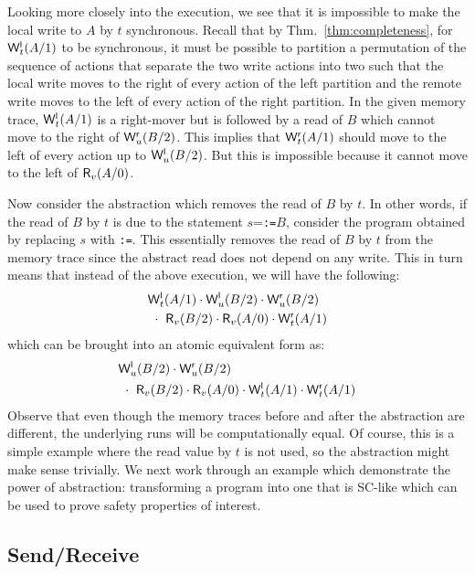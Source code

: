 Looking more closely into the execution, we see that it is impossible to make the local write to $A$ by $t$ synchronous. 
Recall that by Thm.~\ref{thm:completeness}, for $\mathsf{W}^{\mathsf{l}}_{t}(A/1)$ to be synchronous, it must be possible to partition a permutation of the sequence of actions that separate the two write actions into two such that the local write moves to the right of every action of the left partition and the remote write moves to the left of every action of the right partition.
In the given memory trace, $\mathsf{W}^{\mathsf{l}}_{t}(A/1)$ is a right-mover but is followed by a read of $B$ which cannot move to the right of $\mathsf{W}^{\mathsf{r}}_{u}(B/2)$.
This implies that $\mathsf{W}^{\mathsf{r}}_{t}(A/1)$ should move to the left of every action up to $\mathsf{W}^{\mathsf{l}}_{u}(B/2)$.
But this is impossible because it cannot move to the left of $\mathsf{R}_{v}(A/0)$.

Now consider the abstraction which removes the read of $B$ by $t$.
In other words, if the read of $B$ by $t$ is due to the statement $s$={\tt {}:=$B$}, consider the program obtained by replacing $s$ with {\tt {}:=\alihavocval}.
This essentially removes the read of $B$ by $t$ from the memory trace since the abstract read does not depend on any write.
This in turn means that instead of the above execution, we will have the following:
\begin{eqnarray*}
&\mathsf{W}^{\mathsf{l}}_{t}(A/1) \cdot \mathsf{W}^{\mathsf{l}}_{u}(B/2) \cdot \mathsf{W}^{\mathsf{r}}_{u}(B/2)\\
&\ \cdot\ \mathsf{R}_{v}(B/2) \cdot \mathsf{R}_{v}(A/0) \cdot \mathsf{W}^{\mathsf{r}}_{t}(A/1)
\end{eqnarray*}
which can be brought into an atomic equivalent form as:
\begin{eqnarray*}
&\mathsf{W}^{\mathsf{l}}_{u}(B/2) \cdot \mathsf{W}^{\mathsf{r}}_{u}(B/2)\\
&\ \cdot\ \mathsf{R}_{v}(B/2) \cdot \mathsf{R}_{v}(A/0) \cdot \mathsf{W}^{\mathsf{l}}_{t}(A/1) \cdot \mathsf{W}^{\mathsf{r}}_{t}(A/1)
\end{eqnarray*}
Observe that even though the memory traces before and after the abstraction are different, the underlying runs will be computationally equal.
Of course, this is a simple example where the read value by $t$ is not used, so the abstraction might make sense trivially. 
We next work through an example which demonstrate the power of abstraction: transforming a program into one that is SC-like which can be used to prove safety properties of interest.
 
\subsection{Send/Receive}
\label{subsec:send-receive}

